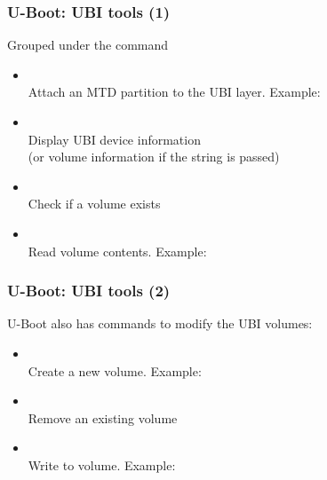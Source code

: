 \begin{frame}
  \frametitle{U-Boot: UBI tools (1)}
  Grouped under the  command
    \begin{itemize}
    \item {}\\
	Attach an MTD partition to the UBI layer. Example:\\
    \item {}\\
	Display UBI device information\\
	(or volume information if the  string is passed)
    \item {}\\
	Check if a volume exists
    \item {}\\
	Read volume contents. Example:\\
    \end{itemize}
\end{frame}

\begin{frame}
  \frametitle{U-Boot: UBI tools (2)}
  U-Boot also has commands to modify the UBI volumes:
    \begin{itemize}
    \item {}\\
	Create a new volume. Example:\\
    \item {}\\
	Remove an existing volume
    \item {}\\
        Write to volume. Example:\\
	\\
    \end{itemize}
\end{frame}

